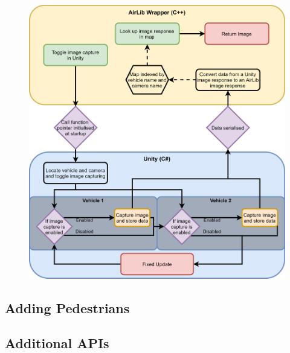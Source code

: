 \begin{figure}[h]
    \centering
    \includegraphics[width=1.0\textwidth]{06_Implementation/00_AirSim/Diagrams/imagecaptureUpdated.png}
    \caption{} \label{06:imageCaptureUpdated}
\end{figure}

\subsection{Adding Pedestrians}

\subsection{Additional APIs}

